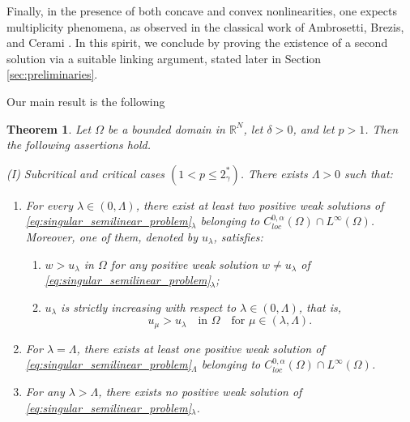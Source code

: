 \documentclass[11pt]{article}
\newtheorem{theorem}{Theorem}[section] %
\begin{document}
Finally, in the presence of both concave and convex nonlinearities, one expects multiplicity phenomena, as observed in the classical work of Ambrosetti, Brezis, and Cerami \cite{abc_laplacian}. In this spirit, we conclude by proving the existence of a second solution via a suitable linking argument, stated later in Section \ref{sec:preliminaries}.


Our main result is the following 

\begin{theorem}
Let $\Omega$ be a bounded domain in $\mathbb{R}^{N}$, let $\delta>0$, and let $p>1$. Then the following assertions hold.

\medskip

\noindent\textnormal{(I) Subcritical and critical cases} $(1< p \leq 2_{\gamma}^*)$.
There exists $\Lambda>0$ such that:
\begin{enumerate}
  \item[(1)] For every $\lambda \in (0,\Lambda)$, there exist at least two positive weak solutions of \eqref{eq:singular_semilinear_problem}$_{\lambda}$ belonging to $C_{loc}^{0,\alpha}(\Omega) \cap L^{\infty}(\Omega)$. Moreover, one of them, denoted by $u_{\lambda}$, satisfies:
  \begin{enumerate}
    \item[(i)] $w > u_{\lambda}$ in $\Omega$ for any positive weak solution $w \neq u_{\lambda}$ of \eqref{eq:singular_semilinear_problem}$_{\lambda}$;
    \item[(ii)] $u_{\lambda}$ is strictly increasing with respect to $\lambda \in (0,\Lambda)$, that is,
    \[
      u_{\mu} > u_{\lambda} \quad \text{in } \Omega \quad \text{for } \mu \in (\lambda,\Lambda).
    \]
  \end{enumerate}
  \item[(2)] For $\lambda = \Lambda$, there exists at least one positive weak solution of \eqref{eq:singular_semilinear_problem}$_{\Lambda}$ belonging to $C_{loc}^{0,\alpha}(\Omega) \cap L^{\infty}(\Omega)$.
  \item[(3)] For any $\lambda > \Lambda$, there exists no positive weak solution of \eqref{eq:singular_semilinear_problem}$_{\lambda}$.
\end{enumerate}

\medskip


\end{theorem}
\end{document}
